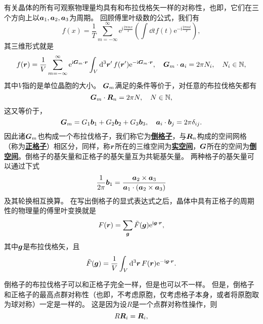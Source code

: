 \documentclass[hyperref, UTF8, a4paper]{ctexart}
\newcommand*{\ii}{\mathrm{i}}
\newcommand*{\ee}{\mathrm{e}}
\newcommand*{\concept}[1]{\underline{\textbf{#1}}}
\begin{document}
有关晶体的所有可观察物理量均具有和布拉伐格矢一样的对称性，也即，它们在三个方向上以$\vb*{a}_1,\vb*{a}_2,\vb*{a}_3$为周期。
回顾傅里叶级数的公式，我们有
\[
    f(x) = \frac{1}{T} \sum_{m=-\infty}^\infty \ee^{\ii \frac{2\pi m x}{T}} \left(\int \dd{t} f(t) \ee^{-\ii \frac{2\pi m t}{T}}\right) ,
\]
其三维形式就是
\[
    f(\vb*{r}) = \frac{1}{V} \sum_{m=-\infty}^\infty \ee^{\ii \vb*{G}_m \cdot \vb*{r}} \int_V \dd[3]{\vb*{r}'} f(\vb*{r}') \ee^{- \ii \vb*{G}_m \cdot \vb*{r}}, \quad \vb*{G}_m \cdot \vb*{a}_i = 2\pi N_i, \quad N_i \in \mathbb{N},
\]
其中$V$指的是单位晶胞的大小。
$\vb*{G}_m$满足的条件等价于，对任意的布拉伐格矢都有
\begin{equation}
    \vb*{G}_m \cdot \vb*{R}_n = 2\pi N, \quad N \in \mathbb{N},
\end{equation}
这又等价于，
\begin{equation}
    \vb*{G}_m = G_1 \vb*{b}_1 + G_2 \vb*{b}_2 + G_3 \vb*{b}_3, \quad \vb*{a}_i \cdot \vb*{b}_j = 2 \pi \delta_{ij}.
\end{equation}
因此诸$\vb*{G}_m$也构成一个布拉伐格子，我们称它为\concept{倒格子}，与$\vb*{R}_n$构成的空间网格（称为\concept{正格子}）相区分，同样，称$\vb*{r}$所在的三维空间为\concept{实空间}，$\vb*{G}$所在的空间为\concept{倒空间}。倒格子的基矢量和正格子的基矢量互为共轭基矢量。
两种格子的基矢量可以通过下式
\begin{equation}
    \frac{1}{2\pi} \vb*{b}_1 = \frac{\vb*{a}_2 \times \vb*{a}_3}{\vb*{a}_1 \cdot (\vb*{a}_2 \times \vb*{a}_3)}
\end{equation}
及其轮换相互换算。
在写出倒格子的显式表达式之后，晶体中具有正格子的周期性的物理量的傅里叶变换就是
\begin{equation}
    F(\vb*{r}) = \sum_{\vb*{g}} \tilde{F}(\vb*{g}) \ee^{\ii \vb*{g} \cdot \vb*{r}},
\end{equation}
其中$\vb*{g}$是布拉伐格矢，且
\begin{equation}
    \tilde{F}(\vb*{g}) = \frac{1}{V} \int_V \dd[3]{\vb*{r}} F(\vb*{r}) \ee^{-\ii \vb*{g} \cdot \vb*{r}}.
\end{equation}

倒格子的布拉伐格子可以和正格子完全一样，但是也可以不一样。
但是，倒格子和正格子的最高点群对称性（也即，不考虑原胞，仅考虑格子本身，或者将原胞取为球对称）一定是一样的。
这是因为设$R$是一个点群对称性操作，则
\[
    R \vb*{R}_i = \vb*{R}_i,
\]
\end{document}
